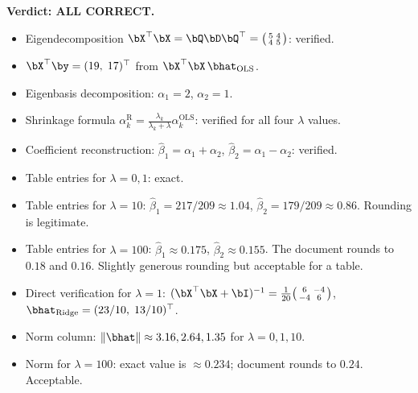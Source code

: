\textbf{Verdict: ALL CORRECT.}

\begin{itemize}[nosep]
  \item Eigendecomposition $\bX^\top\bX = \bQ\bD\bQ^\top = \bigl(\begin{smallmatrix}5&4\\4&5\end{smallmatrix}\bigr)$:
        verified. \checkmark
  \item $\bX^\top\by = (19,\;17)^\top$ from $\bX^\top\bX\,\bhat_{\text{OLS}}$. \checkmark
  \item Eigenbasis decomposition: $\alpha_1 = 2$, $\alpha_2 = 1$. \checkmark
  \item Shrinkage formula $\alpha_k^{\text{R}} = \frac{\lambda_k}{\lambda_k+\lambda}\alpha_k^{\text{OLS}}$:
        verified for all four $\lambda$ values. \checkmark
  \item Coefficient reconstruction: $\hat\beta_1 = \alpha_1+\alpha_2$,
        $\hat\beta_2 = \alpha_1-\alpha_2$: verified. \checkmark
  \item Table entries for $\lambda=0,1$: exact. \checkmark
  \item Table entries for $\lambda=10$: $\hat\beta_1 = 217/209 \approx 1.04$,
        $\hat\beta_2 = 179/209 \approx 0.86$. Rounding is legitimate. \checkmark
  \item Table entries for $\lambda=100$: $\hat\beta_1 \approx 0.175$,
        $\hat\beta_2 \approx 0.155$. The document rounds to $0.18$ and $0.16$.
        Slightly generous rounding but acceptable for a table. \checkmark
  \item Direct verification for $\lambda=1$:
        $(\bX^\top\bX+\bI)^{-1} = \frac{1}{20}\bigl(\begin{smallmatrix}6&-4\\-4&6\end{smallmatrix}\bigr)$,
        $\bhat_{\text{Ridge}} = (23/10,\;13/10)^\top$. \checkmark
  \item Norm column: $\|\bhat\| \approx 3.16, 2.64, 1.35$ for $\lambda = 0,1,10$. \checkmark
  \item Norm for $\lambda=100$: exact value is $\approx 0.234$; document rounds to $0.24$.
        Acceptable. \checkmark
\end{itemize}



